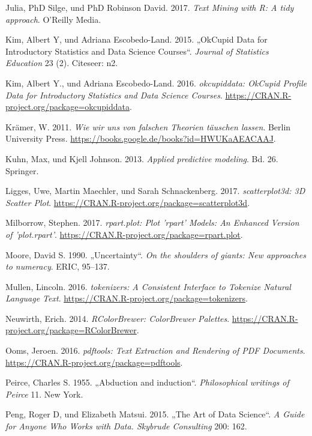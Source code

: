 \documentclass[12pt,ngerman,]{book}
\begin{document}
\hypertarget{ref-tidytextminig}{}
Julia, PhD Silge, und PhD Robinson David. 2017. \emph{Text Mining with
R: A tidy approach}. O'Reilly Media.

\hypertarget{ref-kim2015okcupid}{}
Kim, Albert Y, und Adriana Escobedo-Land. 2015. „OkCupid Data for
Introductory Statistics and Data Science Courses``. \emph{Journal of
Statistics Education} 23 (2). Citeseer: n2.

\hypertarget{ref-R-okcupiddata}{}
Kim, Albert Y., und Adriana Escobedo-Land. 2016. \emph{okcupiddata:
OkCupid Profile Data for Introductory Statistics and Data Science
Courses}. \url{https://CRAN.R-project.org/package=okcupiddata}.

\hypertarget{ref-kraemer2011wir}{}
Krämer, W. 2011. \emph{Wie wir uns von falschen Theorien täuschen
lassen}. Berlin University Press.
\url{https://books.google.de/books?id=HWUKaAEACAAJ}.

\hypertarget{ref-kuhn2013applied}{}
Kuhn, Max, und Kjell Johnson. 2013. \emph{Applied predictive modeling}.
Bd. 26. Springer.

\hypertarget{ref-R-scatterplot3d}{}
Ligges, Uwe, Martin Maechler, und Sarah Schnackenberg. 2017.
\emph{scatterplot3d: 3D Scatter Plot}.
\url{https://CRAN.R-project.org/package=scatterplot3d}.

\hypertarget{ref-R-rpart.plot}{}
Milborrow, Stephen. 2017. \emph{rpart.plot: Plot 'rpart' Models: An
Enhanced Version of 'plot.rpart'}.
\url{https://CRAN.R-project.org/package=rpart.plot}.

\hypertarget{ref-moore1990uncertainty}{}
Moore, David S. 1990. „Uncertainty``. \emph{On the shoulders of giants:
New approaches to numeracy}. ERIC, 95--137.

\hypertarget{ref-R-tokenizers}{}
Mullen, Lincoln. 2016. \emph{tokenizers: A Consistent Interface to
Tokenize Natural Language Text}.
\url{https://CRAN.R-project.org/package=tokenizers}.

\hypertarget{ref-R-RColorBrewer}{}
Neuwirth, Erich. 2014. \emph{RColorBrewer: ColorBrewer Palettes}.
\url{https://CRAN.R-project.org/package=RColorBrewer}.

\hypertarget{ref-R-pdftools}{}
Ooms, Jeroen. 2016. \emph{pdftools: Text Extraction and Rendering of PDF
Documents}. \url{https://CRAN.R-project.org/package=pdftools}.

\hypertarget{ref-peirce1955abduction}{}
Peirce, Charles S. 1955. „Abduction and induction``. \emph{Philosophical
writings of Peirce} 11. New York.

\hypertarget{ref-peng2015art}{}
Peng, Roger D, und Elizabeth Matsui. 2015. „The Art of Data Science``.
\emph{A Guide for Anyone Who Works with Data. Skybrude Consulting} 200:
162.
\end{document}
